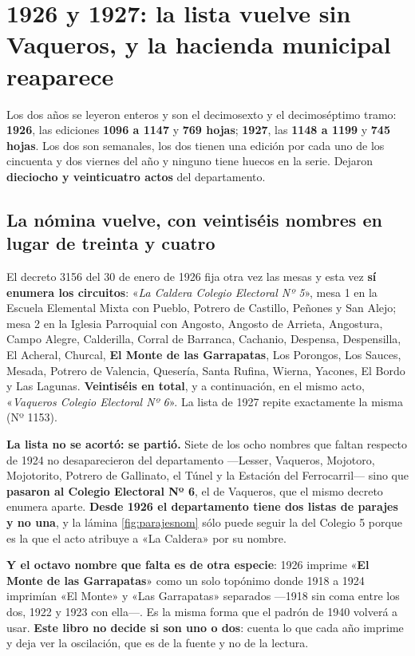 \section{1926 y 1927: la lista vuelve sin Vaqueros, y la hacienda municipal reaparece}

Los dos años se leyeron enteros y son el decimosexto y el decimoséptimo tramo: \textbf{1926}, las
ediciones \textbf{1096 a 1147} y \textbf{769 hojas}; \textbf{1927}, las \textbf{1148 a 1199} y
\textbf{745 hojas}. Los dos son semanales, los dos tienen una edición por cada uno de los
cincuenta y dos viernes del año y ninguno tiene huecos en la serie. Dejaron \textbf{dieciocho y
veinticuatro actos} del departamento.

\subsection*{La nómina vuelve, con veintiséis nombres en lugar de treinta y cuatro}

El decreto 3156 del 30 de enero de 1926 fija otra vez las mesas y esta vez \textbf{sí enumera los
circuitos}: «\textit{La Caldera Colegio Electoral Nº 5}», mesa 1 en la Escuela Elemental Mixta con
Pueblo, Potrero de Castillo, Peñones y San Alejo; mesa 2 en la Iglesia Parroquial con Angosto,
Angosto de Arrieta, Angostura, Campo Alegre, Calderilla, Corral de Barranca, Cachanio, Despensa,
Despensilla, El Acheral, Churcal, \textbf{El Monte de las Garrapatas}, Los Porongos, Los Sauces,
Mesada, Potrero de Valencia, Quesería, Santa Rufina, Wierna, Yacones, El Bordo y Las Lagunas.
\textbf{Veintiséis en total}, y a continuación, en el mismo acto, «\textit{Vaqueros Colegio
Electoral Nº 6}». La lista de 1927 repite exactamente la misma (Nº 1153).

\begin{cautela}
\textbf{La lista no se acortó: se partió.} Siete de los ocho nombres que faltan respecto de 1924 no
desaparecieron del departamento ---Lesser, Vaqueros, Mojotoro, Mojotorito, Potrero de Gallinato,
el Túnel y la Estación del Ferrocarril--- sino que \textbf{pasaron al Colegio Electoral Nº 6}, el
de Vaqueros, que el mismo decreto enumera aparte. \textbf{Desde 1926 el departamento tiene dos
listas de parajes y no una}, y la lámina \ref{fig:parajesnom} sólo puede seguir la del Colegio 5
porque es la que el acto atribuye a «La Caldera» por su nombre.

\textbf{Y el octavo nombre que falta es de otra especie}: 1926 imprime «\textbf{El Monte de las
Garrapatas}» como un solo topónimo donde 1918 a 1924 imprimían «El Monte» y «Las Garrapatas»
separados ---1918 sin coma entre los dos, 1922 y 1923 con ella---. Es la misma forma que el padrón
de 1940 volverá a usar. \textbf{Este libro no decide si son uno o dos}: cuenta lo que cada año
imprime y deja ver la oscilación, que es de la fuente y no de la lectura.
\end{cautela}


